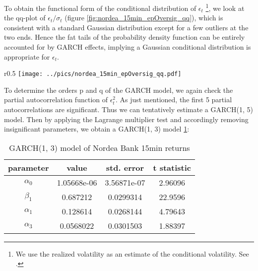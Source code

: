 \documentclass{book}
\begin{document}
To obtain the functional form of the conditional distribution of
$\epsilon_t$ \footnote{We use the realized volatility as an estimate of the
conditional volatility. See \cite{Andersen03}.}, we look at the
qq-plot of $\epsilon_t/\sigma_t$ (figure
\ref{fig:nordea_15min_epOversig_qq}), which is consistent with a
standard Gaussian distribution except for a few outliers at the two
ends. Hence the fat tails of the probability density function can be
entirely accounted for by GARCH effects, implying a Gaussian
conditional distribution is appropriate for $\epsilon_t$.
\begin{wrapfigure}{r}{0.5\textwidth}
  \centering
    \texttt{[image: ../pics/nordea\_15min\_epOversig\_qq.pdf]}
  \caption{\scriptsize{QQ-plot of $\epsilon_t / \sigma_t$. $\epsilon_t$ are
    derived from Nordea Bank 15min returns while $\sigma_t$ are realized
    volatilities calculated using 30s returns within each 15min
    interval.}}
  \label{fig:nordea_15min_epOversig_qq}
\end{wrapfigure}

To determine the orders p and q of the GARCH model, we again check
the partial autocorrelation function of $\epsilon_t^2$. As just
mentioned, the first 5 partial autocorrelations are significant. Thus
we can tentatively estimate a GARCH(1, 5) model. Then by applying the
Lagrange multiplier test and accordingly removing insignificant
parameters, we obtain a GARCH(1, 3) model
\ref{tab:nordea_15min_garch}:
\begin{table}[htb!]
  \centering
  \begin{tabular}{c|c|c|c}
    parameter & value & std. error & t statistic \\
    \hline
     $\alpha_0$ &   1.05668e-06 &   3.56871e-07 &    2.96096\\
     \hline
     $\beta_1$  &     0.687212  &   0.0299314   &    22.9596\\
     \hline
     $\alpha_1$ &      0.128614 &   0.0268144   &    4.79643\\
     \hline
     $\alpha_3$ &    0.0568022  &   0.0301503   &    1.88397
  \end{tabular}
  \caption{\footnotesize GARCH(1, 3) model of Nordea Bank 15min returns}
  \label{tab:nordea_15min_garch}
\end{table}
\end{document}
